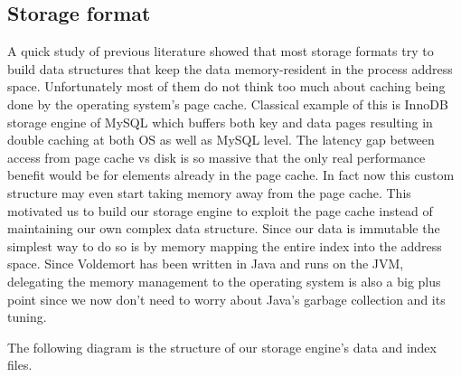 \documentclass[10pt,twocolumn,preprint,natbib,authoryear]{sigplanconf}
\begin{document}
\subsection{Storage format}

A quick study of previous literature showed that most storage formats try to build data structures that keep the data memory-resident in the process address space. Unfortunately most of them do not think too much about caching being done by the operating system's page cache. Classical example of this is InnoDB storage engine of MySQL which buffers both key and data pages resulting in double caching \cite{Page 203 - Understanding MySQL internals} at both OS as well as MySQL level. The latency gap between access from page cache vs disk is so massive that the only real performance benefit would be for elements already in the page cache. In fact now this custom structure may even start taking memory away from the page cache. This motivated us to build our storage engine to exploit the page cache instead of maintaining our own complex data structure. Since our data is immutable the simplest way to do so is by memory mapping the entire index into the address space. Since Voldemort has been written in Java and runs on the JVM, delegating the memory management to the operating system is also a big plus point since we now don't need to worry about Java's garbage collection and its tuning.

The following diagram is the structure of our storage engine's data and index files. 
\end{document}
